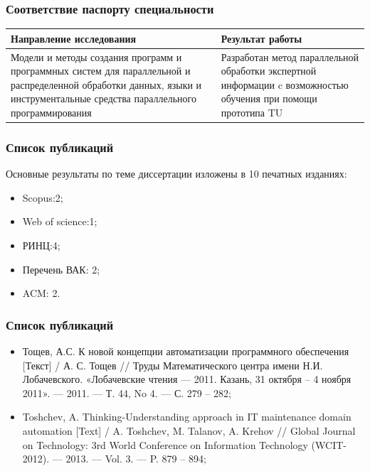 \documentclass[14pt]{beamer}
\begin{document}
\begin{frame}
\frametitle{Соответствие паспорту специальности}

\begin{table}
	
\small

\begin{tabular} {|p{5cm}|p{5cm}|}


 \hline
\textbf{Направление исследования} & Результат работы\\

 \hline
   Модели и методы создания программ и программных систем для параллельной и распределенной обработки данных, языки и инструментальные средства параллельного программирования & Разработан метод параллельной обработки экспертной информации c возможностью обучения при помощи прототипа TU \\
   \hline
 \end{tabular}
\end{table}
\end{frame}

\begin{frame}
\frametitle{Список публикаций}
 Основные результаты по теме диссертации изложены в 10 печатных изданиях:
\begin{itemize}
	\item Scopus:2;
	\item Web of science:1;
	\item РИНЦ:4;
	\item Перечень ВАК: 2;
	\item ACM: 2.
\end{itemize}
\end{frame}

\begin{frame}
\frametitle{Список публикаций}

\begin{itemize}
	\item Тощев, А.С. К новой концепции автоматизации программного обеспечения [Текст] / А. С. Тощев // Труды Математического центра имени Н.И. Лобачевского. «Лобачевские чтения — 2011. Казань, 31 октября – 4 ноября 2011». –– 2011. –– Т. 44, No 4. –– С. 279 – 282; 
	\item Toshchev, A. Thinking-Understanding approach in IT maintenance domain automation [Text] / A. Toshchev, M. Talanov, A. Krehov // Global Journal on Technology: 3rd World Conference on Information Technology (WCIT-2012). — 2013. — Vol. 3. — P. 879 – 894;
	
\end{itemize}
\end{frame}
\end{document}

